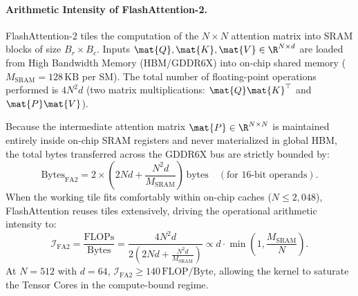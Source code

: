 \paragraph{Arithmetic Intensity of FlashAttention-2.}
FlashAttention-2 tiles the computation of the $N \times N$ attention matrix into SRAM blocks of size $B_r \times B_c$. Inputs $\mat{Q}, \mat{K}, \mat{V} \in \R^{N \times d}$ are loaded from High Bandwidth Memory (HBM/GDDR6X) into on-chip shared memory ($M_{\text{SRAM}} = 128\,\text{KB}$ per SM). The total number of floating-point operations performed is $4 N^2 d$ (two matrix multiplications: $\mat{Q}\mat{K}^\top$ and $\mat{P}\mat{V}$).

Because the intermediate attention matrix $\mat{P} \in \R^{N \times N}$ is maintained entirely inside on-chip SRAM registers and never materialized in global HBM, the total bytes transferred across the GDDR6X bus are strictly bounded by:
\begin{equation}
\label{eq:fa2_bytes}
\text{Bytes}_{\text{FA2}} = 2 \times \left( 2 N d + \frac{N^2 d}{M_{\text{SRAM}}} \right)\,\text{bytes}\quad(\text{for 16-bit operands}).
\end{equation}
When the working tile fits comfortably within on-chip caches ($N \le 2{,}048$), FlashAttention reuses tiles extensively, driving the operational arithmetic intensity to:
\begin{equation}
\label{eq:fa2_intensity}
\mathcal{I}_{\text{FA2}} = \frac{\text{FLOPs}}{\text{Bytes}} = \frac{4 N^2 d}{2 \left( 2 N d + \frac{N^2 d}{M_{\text{SRAM}}} \right)} \propto d \cdot \min\left(1, \frac{M_{\text{SRAM}}}{N}\right).
\end{equation}
At $N=512$ with $d=64$, $\mathcal{I}_{\text{FA2}} \ge 140\,\text{FLOP/Byte}$, allowing the kernel to saturate the Tensor Cores in the compute-bound regime.

